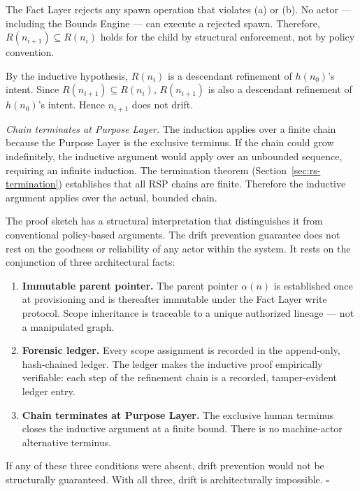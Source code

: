 The Fact Layer rejects any spawn operation that violates (a) or (b). No actor — including the Bounds Engine — can execute a rejected spawn. Therefore, $R(n_{i+1}) \subseteq R(n_i)$ holds for the child by structural enforcement, not by policy convention.

By the inductive hypothesis, $R(n_i)$ is a descendant refinement of $h(n_0)$'s intent. Since $R(n_{i+1}) \subseteq R(n_i)$, $R(n_{i+1})$ is also a descendant refinement of $h(n_0)$'s intent. Hence $n_{i+1}$ does not drift.

\medskip
\textit{Chain terminates at Purpose Layer.} The induction applies over a finite chain because the Purpose Layer is the exclusive terminus. If the chain could grow indefinitely, the inductive argument would apply over an unbounded sequence, requiring an infinite induction. The termination theorem (Section~\ref{sec:rs-termination}) establishes that all RSP chains are finite. Therefore the inductive argument applies over the actual, bounded chain.

\medskip
The proof sketch has a structural interpretation that distinguishes it from conventional policy-based arguments. The drift prevention guarantee does not rest on the goodness or reliability of any actor within the system. It rests on the conjunction of three architectural facts:

\begin{enumerate}
    \item[(1)] \textbf{Immutable parent pointer.} The parent pointer $\alpha(n)$ is established once at provisioning and is thereafter immutable under the Fact Layer write protocol. Scope inheritance is traceable to a unique authorized lineage — not a manipulated graph.
    \item[(2)] \textbf{Forensic ledger.} Every scope assignment is recorded in the append-only, hash-chained ledger. The ledger makes the inductive proof empirically verifiable: each step of the refinement chain is a recorded, tamper-evident ledger entry.
    \item[(3)] \textbf{Chain terminates at Purpose Layer.} The exclusive human terminus closes the inductive argument at a finite bound. There is no machine-actor alternative terminus.
\end{enumerate}

If any of these three conditions were absent, drift prevention would not be structurally guaranteed. With all three, drift is architecturally impossible. $\square$

